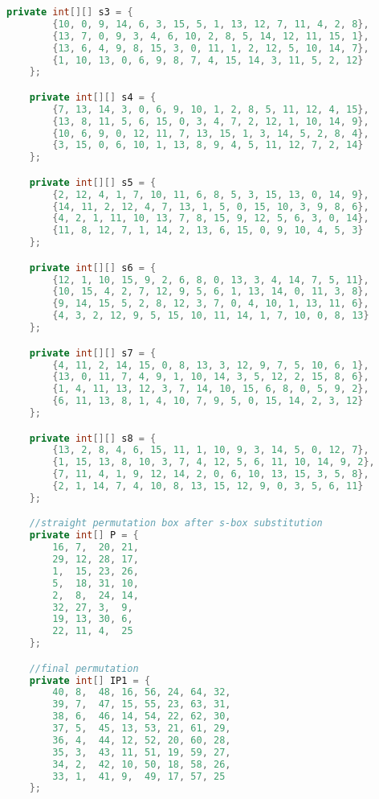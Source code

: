 \begin{lstlisting}[language=Java,basicstyle=\tiny,caption=DESDecryption.java]
    private int[][] s3 = {
        {10, 0, 9, 14, 6, 3, 15, 5, 1, 13, 12, 7, 11, 4, 2, 8},
        {13, 7, 0, 9, 3, 4, 6, 10, 2, 8, 5, 14, 12, 11, 15, 1},
        {13, 6, 4, 9, 8, 15, 3, 0, 11, 1, 2, 12, 5, 10, 14, 7},
        {1, 10, 13, 0, 6, 9, 8, 7, 4, 15, 14, 3, 11, 5, 2, 12}
    };

    private int[][] s4 = {
        {7, 13, 14, 3, 0, 6, 9, 10, 1, 2, 8, 5, 11, 12, 4, 15},
        {13, 8, 11, 5, 6, 15, 0, 3, 4, 7, 2, 12, 1, 10, 14, 9},
        {10, 6, 9, 0, 12, 11, 7, 13, 15, 1, 3, 14, 5, 2, 8, 4},
        {3, 15, 0, 6, 10, 1, 13, 8, 9, 4, 5, 11, 12, 7, 2, 14}
    };

    private int[][] s5 = {
        {2, 12, 4, 1, 7, 10, 11, 6, 8, 5, 3, 15, 13, 0, 14, 9},
        {14, 11, 2, 12, 4, 7, 13, 1, 5, 0, 15, 10, 3, 9, 8, 6},
        {4, 2, 1, 11, 10, 13, 7, 8, 15, 9, 12, 5, 6, 3, 0, 14},
        {11, 8, 12, 7, 1, 14, 2, 13, 6, 15, 0, 9, 10, 4, 5, 3}
    };

    private int[][] s6 = {
        {12, 1, 10, 15, 9, 2, 6, 8, 0, 13, 3, 4, 14, 7, 5, 11},
        {10, 15, 4, 2, 7, 12, 9, 5, 6, 1, 13, 14, 0, 11, 3, 8},
        {9, 14, 15, 5, 2, 8, 12, 3, 7, 0, 4, 10, 1, 13, 11, 6},
        {4, 3, 2, 12, 9, 5, 15, 10, 11, 14, 1, 7, 10, 0, 8, 13}
    };

    private int[][] s7 = {
        {4, 11, 2, 14, 15, 0, 8, 13, 3, 12, 9, 7, 5, 10, 6, 1},
        {13, 0, 11, 7, 4, 9, 1, 10, 14, 3, 5, 12, 2, 15, 8, 6},
        {1, 4, 11, 13, 12, 3, 7, 14, 10, 15, 6, 8, 0, 5, 9, 2},
        {6, 11, 13, 8, 1, 4, 10, 7, 9, 5, 0, 15, 14, 2, 3, 12}
    };

    private int[][] s8 = {
        {13, 2, 8, 4, 6, 15, 11, 1, 10, 9, 3, 14, 5, 0, 12, 7},
        {1, 15, 13, 8, 10, 3, 7, 4, 12, 5, 6, 11, 10, 14, 9, 2},
        {7, 11, 4, 1, 9, 12, 14, 2, 0, 6, 10, 13, 15, 3, 5, 8},
        {2, 1, 14, 7, 4, 10, 8, 13, 15, 12, 9, 0, 3, 5, 6, 11}
    };

    //straight permutation box after s-box substitution
    private int[] P = {
        16, 7,  20, 21,
        29, 12, 28, 17,
        1,  15, 23, 26,
        5,  18, 31, 10,
        2,  8,  24, 14,
        32, 27, 3,  9,
        19, 13, 30, 6,
        22, 11, 4,  25
    };

    //final permutation
    private int[] IP1 = {
        40, 8,  48, 16, 56, 24, 64, 32,
        39, 7,  47, 15, 55, 23, 63, 31,
        38, 6,  46, 14, 54, 22, 62, 30,
        37, 5,  45, 13, 53, 21, 61, 29,
        36, 4,  44, 12, 52, 20, 60, 28,
        35, 3,  43, 11, 51, 19, 59, 27,
        34, 2,  42, 10, 50, 18, 58, 26,
        33, 1,  41, 9,  49, 17, 57, 25
    };


\end{lstlisting}
